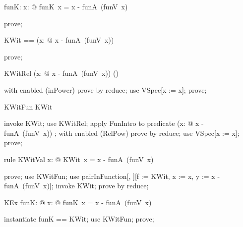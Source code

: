 \documentclass{article}
\begin{document}
\begin{axdef}
  funK: \nat \fun \nat
\where
   \forall x: \nat @ funK~x = x - funA~(funV~x)
\end{axdef}

\begin{zproof}
prove;
\end{zproof}

\begin{zed}
  KWit == (\lambda x: \nat @ x - funA~(funV~x))
\end{zed}

\begin{zproof}
prove;
\end{zproof}

\begin{theorem}{KWitRel}
  (\lambda x: \nat @ x - funA~(funV~x)) \in \power (\nat \cross \nat)
\end{theorem}

\begin{zproof}
with enabled (inPower) prove by reduce;
use VSpec[x := x];
prove;
\end{zproof}

\begin{theorem}{KWitFun}
  KWit \in \nat \fun \nat
\end{theorem}

\begin{zproof}
invoke KWit;
use KWitRel;
apply FunIntro to predicate (\lambda x: \nat @ x - funA~(funV~x)) \in \nat \fun \nat;
with enabled (RelPow) prove by reduce;
use VSpec[x := x];
prove;
\end{zproof}

\begin{theorem}{rule KWitVal}
  \forall x: \nat @ KWit~x = x - funA~(funV~x)
\end{theorem}

\begin{zproof}
prove;
use KWitFun;
use pairInFunction[\nat, \nat][f := KWit, x := x, y := x - funA~(funV~x)];
invoke KWit;
prove by reduce;
\end{zproof}

\begin{theorem}{KEx}
  \exists funK: \nat \fun \nat @ \forall x: \nat @ funK~x = x - funA~(funV~x)
\end{theorem}

\begin{zproof}
instantiate funK == KWit;
use KWitFun;
prove;
\end{zproof}
\end{document}
